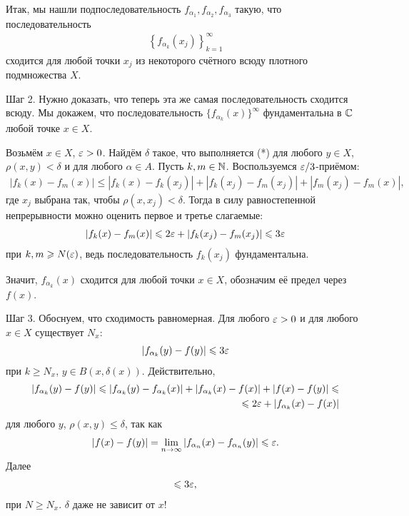 \documentclass[../complex-analysis.tex]{subfiles}
\begin{document}
Итак, мы нашли подпоследовательность $ f_{\alpha_1}, f_{\alpha_2}, f_{\alpha_3} $ такую, что последовательность
\begin{align*}
 \left\{f_{\alpha_{k}}(x_j) \right\}_{k=1}^{\infty}
\end{align*} сходится для любой точки $ x_j $ из некоторого счётного всюду плотного подмножества $ X $.

Шаг 2. Нужно доказать, что теперь эта же самая последовательность сходится всюду. Мы докажем, что последовательность $ \{f_{\alpha_k}(x)\}_{}^{\infty}   $ фундаментальна в $ \mathbb{C} $ любой точке $ x \in X $.

Возьмём $ x \in X $, $ \varepsilon > 0 $. Найдём $ \delta $ такое, что выполняется (*) для любого $ y \in X $, $ \rho(x, y) < \delta $ и для любого $ \alpha \in A $. Пусть $ k, m \in \mathbb{N} $. Воспользуемся $ \varepsilon / 3 $-приёмом:
\begin{align*}
 \left| f_{k}(x) - f_{m}(x) \right|\leqslant \left| f_k(x) - f_k(x_j) \right| + \left| f_k(x_j) - f_m(x_j) \right| + \left| f_m(x_j) - f_m(x) \right|,
\end{align*} где $ x_j $ выбрана так, чтобы $ \rho(x, x_j) < \delta $. Тогда в силу равностепенной непрерывности можно оценить первое и третье слагаемые:
\begin{align*}
 \left| f_k(x)-f_m(x) \right| \leqslant 2\varepsilon + \left| f_k(x_j) - f_m(x_j) \right| \leqslant 3\varepsilon
\end{align*} при $ k, m \geqslant N(\varepsilon) $, ведь последовательность $ f_k(x_j) $ фундаментальна.

Значит, $ f_{\alpha_k}(x) $ сходится для любой точки $ x \in X $, обозначим её предел через $ f(x) $.

Шаг 3. Обоснуем, что сходимость равномерная. Для любого $ \varepsilon > 0 $ и для любого $ x \in X $ существует $ N_x $:
\begin{align*}
 \left|f_{\alpha_k}(y) - f(y) \right| \leqslant 3\varepsilon
\end{align*} при $ k \geqslant N_x $, $ y \in B(x, \delta(x)) $. Действительно,
\begin{align*}
 \left| f_{\alpha_k}(y) - f(y) \right| \leqslant \left| f_{\alpha_k}(y) - f_{\alpha_k}(x) \right| + \left| f_{\alpha_k}(x) - f(x) \right| + \left| f(x) - f(y) \right| \leqslant \\ \leqslant 2\varepsilon + \left| f_{\alpha_k}(x) - f(x) \right|
\end{align*}  для любого $ y $, $ \rho(x, y) \leqslant \delta $, так как
\begin{align*}
 \left| f(x) - f(y) \right| = \lim_{n \to \infty} \left|f_{\alpha_n}(x) - f_{\alpha_n}(y) \right| \leqslant \varepsilon.
\end{align*} Далее
\begin{align*}
 \leqslant 3\varepsilon,
\end{align*} при $ N \geqslant N_x $. $ \delta $ даже не зависит от $ x $!
\end{document}
